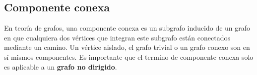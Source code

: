 \subsection{Componente conexa}
En teoría de grafos, una componente conexa es un subgrafo inducido de un grafo en que cualquiera dos vértices que integran este subgrafo están conectados mediante un camino. Un vértice aislado, el grafo trivial o un grafo conexo son en sí mismos componentes. Es importante que el termino de componente conexa solo es aplicable a un \textbf{grafo no dirigido}.